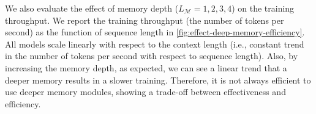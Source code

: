 \documentclass{article}
\newcommand{\M}[0]{\mathcal{M}}
\begin{document}
We also evaluate the effect of memory depth ($L_{\M} = 1, 2, 3, 4$) on the training throughput. We report the training throughput (the number of tokens per second) as the function of sequence length in \autoref{fig:effect-deep-memory-efficiency}. All models scale linearly with respect to the context length (i.e., constant trend in the number of tokens per second with respect to sequence length). Also, by increasing the memory depth, as expected, we can see a linear trend that a deeper memory results in a slower training. Therefore, it is not always efficient to use deeper memory modules, showing a trade-off between effectiveness and efficiency. 

\begin{table}[t!]
\centering
  \caption{\small Performance on long-term forecasting. The best results are \hspace{-1pt} \colorbox{myblue}{highlighted}\hspace{-1pt}. }\label{tab:avg_baseline_results}
  \centering
\end{table}
\end{document}
